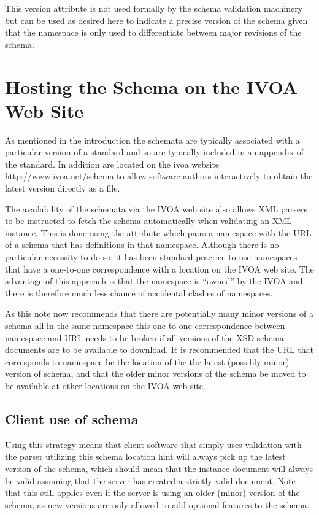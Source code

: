\documentclass[10pt,a4paper]{ivoa}
\begin{document}
This version attribute is not used formally by the schema validation machinery
but can be used as desired here to indicate a precise version of the schema
given that the namespace is only used to differentiate between major revisions
of the schema.



\section{Hosting the Schema on the IVOA Web Site}
As mentioned in the introduction the schemata are typically associated with a
particular version of a standard and so are typically included in an appendix of
the standard. In addition are located on the ivoa website
\url{http://www.ivoa.net/schema} to allow software authors interactively to
obtain the latest version directly as a file.

The availability of the schemata via the IVOA web site also
allows XML parsers to be instructed to fetch the schema automatically when
validating an XML instance. This is done using the 
attribute which pairs a namespace with the URL of a schema that has definitions
in that namespace. Although there is no particular necessity to do so, it has
been standard practice to use namespaces that have a one-to-one correspondence
with a location on the IVOA web site. The advantage of this approach is that the
namespace is ``owned'' by the IVOA and there is therefore much less chance of
accidental clashes of namespaces.

As this note now recommends that there are potentially many minor versions of a
schema all in the same namespace this one-to-one correspondence between
namespace and URL needs to be broken if all versions of the XSD schema documents
are to be available to download. It is recommended that the URL that
corresponds to namespace be the location of the the latest (possibly minor)
version of schema, and that the older minor versions of the schema be moved to
be available at other locations on the IVOA web site.

\subsection{Client use of schema}
Using this strategy means that client software that simply uses validation with
the parser utilizing this schema location hint will always pick up the latest
version of the schema, which should mean that the instance document will always
be valid assuming that the server has created a strictly valid document. Note
that this still applies even if the server is using an older (minor) version of
the schema, as new versions are only allowed to add optional features to the
schema.
\end{document}
